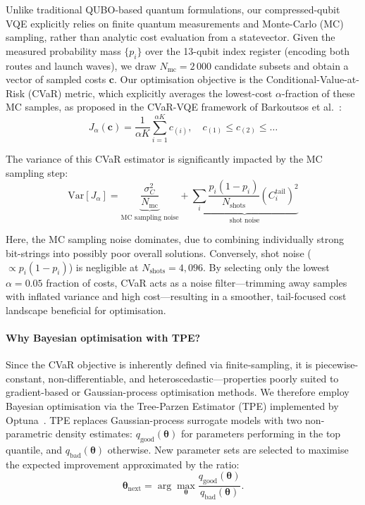 Unlike traditional QUBO-based quantum formulations, our compressed-qubit VQE explicitly relies on finite quantum measurements and Monte-Carlo (MC) sampling, rather than analytic cost evaluation from a statevector. Given the measured probability mass \(\{p_i\}\) over the 13-qubit index register (encoding both routes and launch waves), we draw \(N_{\mathrm{mc}}=2\,000\) candidate subsets and obtain a vector of sampled costs \(\boldsymbol{c}\). Our optimisation objective is the Conditional-Value-at-Risk (CVaR) metric, which explicitly averages the lowest-cost \(\alpha\)-fraction of these MC samples, as proposed in the CVaR-VQE framework of Barkoutsos et al.~\cite{barkoutsos_improving_2020}:
\begin{equation}
   J_{\alpha}(\boldsymbol{c})=\frac{1}{\alpha K}\sum_{i=1}^{\alpha K} c_{(i)},\quad c_{(1)}\leq c_{(2)}\leq\dots
\end{equation}


The variance of this CVaR estimator is significantly impacted by the MC sampling step:
\begin{equation}
    \mathrm{Var}[J_{\alpha}] =
\underbrace{\frac{\sigma_C^{2}}{N_{\mathrm{mc}}}}_{\text{MC sampling noise}}
+ \underbrace{\sum_{i}\frac{p_i(1-p_i)}{N_{\text{shots}}}\left(C_i^{\text{tail}}\right)^2}_{\text{shot noise}}
\end{equation}


Here, the MC sampling noise dominates, due to combining individually strong bit-strings into possibly poor overall solutions. Conversely, shot noise (\(\propto p_i(1-p_i)\)) is negligible at \(N_{\text{shots}}=4,096\). By selecting only the lowest \(\alpha=0.05\) fraction of costs, CVaR acts as a noise filter—trimming away samples with inflated variance and high cost—resulting in a smoother, tail-focused cost landscape beneficial for optimisation.

\paragraph{Why Bayesian optimisation with TPE?}
Since the CVaR objective is inherently defined via finite-sampling, it is piecewise-constant, non-differentiable, and heteroscedastic—properties poorly suited to gradient-based or Gaussian-process optimisation methods. We therefore employ Bayesian optimisation via the Tree-Parzen Estimator (TPE) implemented by Optuna~\cite{akiba_optuna_2019}. TPE replaces Gaussian-process surrogate models with two non-parametric density estimates: \(q_{\text{good}}(\boldsymbol{\theta})\) for parameters performing in the top quantile, and \(q_{\text{bad}}(\boldsymbol{\theta})\) otherwise. New parameter sets are selected to maximise the expected improvement approximated by the ratio:
\[
\boldsymbol{\theta}_{\text{next}} = \arg\max_{\boldsymbol{\theta}} \frac{q_{\text{good}}(\boldsymbol{\theta})}{q_{\text{bad}}(\boldsymbol{\theta})}.
\]

